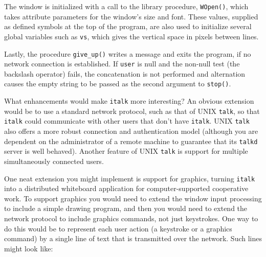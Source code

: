 The window is initialized with a call to the library procedure,
\texttt{WOpen()}, which takes attribute
parameters for the window's size and font. These
values, supplied as defined symbols at the top of the program, are also
used to initialize several global variables such as \texttt{vs}, which
gives the vertical space in pixels between lines.


Lastly, the procedure \texttt{give\_up()} writes a message and exits the
program, if no network connection is established. If \texttt{user} is
null and the non-null test (the backslash operator) fails, the
concatenation is not performed and alternation causes the empty string to be passed as the
second argument to \texttt{stop()}.


What enhancements would make \texttt{italk} more interesting? An
obvious extension would be to use a standard network protocol,
such as that of UNIX \texttt{talk}, so that \texttt{italk} could
communicate with other users that don't have
\texttt{italk}. UNIX \texttt{talk} also offers a more robust connection
and authentication model (although you are dependent on the
administrator of a remote machine to guarantee that its \texttt{talkd}
server is well behaved). Another feature of UNIX \texttt{talk} is
support for multiple simultaneously connected users.

One neat extension you might implement is support for
graphics, turning \texttt{italk} into a distributed whiteboard
application for computer-supported cooperative work. To support
graphics you would need to extend the window input processing to
include a simple drawing program, and then you would need to extend the
network protocol to include graphics commands, not just keystrokes. One
way to do this would be to represent each user action (a keystroke or a
graphics command) by a single line of text that is transmitted over the
network. Such lines might look like:

